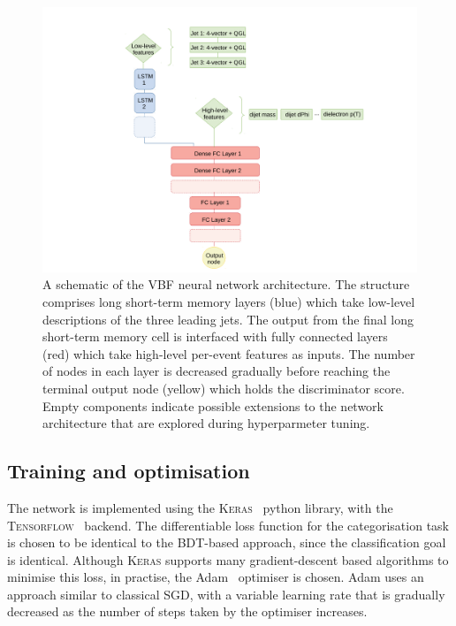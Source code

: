 \begin{figure}[htbp!] 
\centering 
\includegraphics[trim={2cm 0cm 2cm 1cm},clip,width =1\linewidth]{Figures/Hee/VBF/DeepLearning/LSTM_general_structure.pdf}
\caption[The VBF LSTM neural network architecture.]{A schematic of the VBF neural network architecture. The structure comprises long short-term memory layers (blue) which take low-level descriptions of the three leading jets. The output from the final long short-term memory cell is interfaced with fully connected layers (red) which take high-level per-event features as inputs. The number of nodes in each layer is decreased gradually before reaching the terminal output node (yellow) which holds the discriminator score. Empty components indicate possible extensions to the network architecture that are explored during hyperparmeter tuning.}
\label{fig:hee_VBF_lstsm}
\end{figure}

\subsection{Training and optimisation}

The network is implemented using the \textsc{Keras}~\cite{keras} python library, with the \textsc{Tensorflow}~\cite{tensorflow} backend. The differentiable loss function for the categorisation task is chosen to be identical to the BDT-based approach, since the classification goal is identical. Although \textsc{Keras} supports many gradient-descent based algorithms to minimise this loss, in practise, the Adam~\cite{adam} optimiser is chosen. Adam uses an approach similar to classical SGD, with a variable learning rate that is gradually decreased as the number of steps taken by the optimiser increases. 

